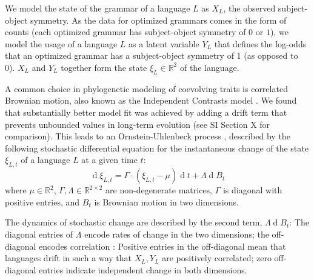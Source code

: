 \documentclass[11pt,a4paper]{article}
\begin{document}

We model the state of the grammar of a language $L$ as $X_L$, the observed subject-object symmetry.
As the data for optimized grammars comes in the form of counts (each optimized grammar has subject-object symmetry of $0$ or $1$), we model the usage of a language $L$ as a latent variable $Y_L$ that defines the log-odds that an optimized grammar has a subject-object symmetry of 1 (as opposed to 0).
$X_L$ and $Y_L$ together form the state $\xi_L \in \mathbb{R}^2$  of the language.



A common choice in phylogenetic modeling of coevolving traits is correlated Brownian motion, also known as the Independent Contrasts model \citep{felsenstein1973maximum,freckleton2012fast}.
We found that substantially better model fit was achieved by adding a drift term that prevents unbounded values  in long-term evolution (see SI Section X for comparison).
This leads to an Ornstein-Uhlenbeck process \citep{blackwell2003bayesian}, described by the following stochastic differential equation for the instantaneous change of the state $\xi_{L,t}$ of a language $L$ at a given time $t$:
\begin{equation*}
    \operatorname{d}\xi_{L,t} = \Gamma \cdot (\xi_{L,t}-\mu) \operatorname{d}t + \Lambda \operatorname{d}B_t
\end{equation*}
where $\mu \in \mathbb{R}^2$,  $\Gamma, \Lambda \in \mathbb{R}^{2\times 2}$ are non-degenerate matrices, $\Gamma$ is diagonal with positive entries, and $B_t$ is Brownian motion in two dimensions.

The dynamics of stochastic change are described by the second term, $\Lambda \operatorname{d}B_t$:
The diagonal entries of $\Lambda$ encode rates of change in the two dimensions; the off-diagonal encodes correlation \citep{felsenstein1973maximum,freckleton2012fast}: Positive entries in the off-diagonal mean that languages drift in such a way that $X_L, Y_L$ are positively correlated; zero off-diagonal entries indicate independent change in both dimensions.
\end{document}
